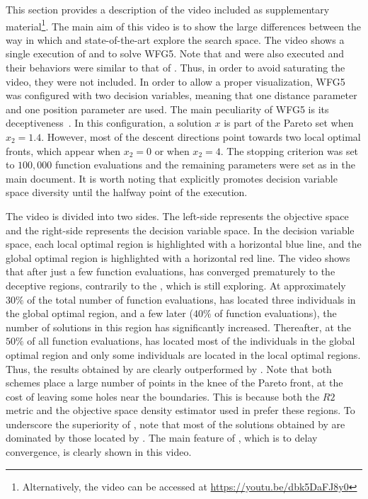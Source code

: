 This section provides a description of the video included as supplementary material\footnote{Alternatively, the video can be accessed 
at \url{https://youtu.be/dbk5DaFJ8y0}}.
%
The main aim of this video is to show the large differences between the way in which \VSDMOEA{} and state-of-the-art \MOEAS{} 
explore the search space.
%
The video shows a single execution of \VSDMOEA{} and \RMOEA{} to solve WFG5.
%
Note that \NSGAII{} and \MOEAD{} were also executed and their behaviors were similar to that of \RMOEA{}.
%
Thus, in order to avoid saturating the video, they were not included.
%
In order to allow a proper visualization, WFG5 was configured with two decision variables, meaning that one distance parameter
and one position parameter are used.
%
The main peculiarity of WFG5 is its deceptiveness~\cite{Joel:WFG}.
%
In this configuration, a solution $x$ is part of the Pareto set when $x_2 = 1.4$.
%
However, most of the descent directions point towards two local optimal fronts, which appear when $x_2 = 0$ or when $x_2 = 4$.
%
The stopping criterion was set to $100,000$ function evaluations and the remaining parameters were set as in the main document.
%
It is worth noting that \VSDMOEA{} explicitly promotes decision variable space diversity until the halfway point of the execution.

The video is divided into two sides.
%
The left-side represents the objective space and the right-side represents the decision variable space.
%
In the decision variable space, each local optimal region is highlighted with a horizontal blue line, and the global optimal region is highlighted 
with a horizontal red line.
%
The video shows that after just a few function evaluations, \RMOEA{} has converged prematurely to the deceptive regions, 
contrarily to the \VSDMOEA{}, which is still exploring.
%
At approximately $30\%$ of the total number of function evaluations, \VSDMOEA{} has 
located three individuals in the global optimal region, and a few later ($40\%$ of function evaluations),
the number of solutions in this region has significantly increased.
%
Thereafter, at the $50\%$ of all function evaluations, \VSDMOEA{} has located most of the individuals in the global optimal region and only 
some individuals are located in the local optimal regions.
%
Thus, the results obtained by \RMOEA{} are clearly outperformed by \VSDMOEA{}.
%
Note that both schemes place a large number of points in the knee of the Pareto front, at the cost of leaving some holes near the boundaries.
%
This is because both the $R2$ metric and the objective space density estimator used in \VSDMOEA{} prefer these regions.
%
To underscore the superiority of \VSDMOEA{}, note that most of the solutions obtained by \RMOEA{} are dominated by those 
located by \VSDMOEA{}.
%
The main feature of \VSDMOEA{}, which is to delay convergence, is clearly shown in this video.

